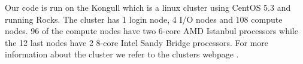 Our code is run on the Kongull which is a linux cluster using CentOS 5.3 and running Rocks. The cluster has 1 login node, 4 I/O nodes and 108 compute nodes. 96 of the compute nodes have two 6-core AMD Istanbul processors while the 12 last nodes have 2 8-core Intel Sandy Bridge processors. For more information about the cluster we refer to the clusters webpage \cite{kongull}.